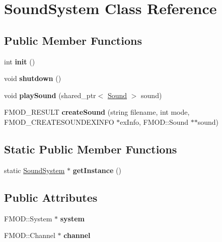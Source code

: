 \hypertarget{class_sound_system}{}\section{Sound\+System Class Reference}
\label{class_sound_system}
\subsection*{Public Member Functions}
\begin{DoxyCompactItemize}
\item 
\hypertarget{class_sound_system_adcb1d5df10d30863c668ac51102d680f}{}int {\bfseries init} ()\label{class_sound_system_adcb1d5df10d30863c668ac51102d680f}

\item 
\hypertarget{class_sound_system_a9c9f6c3017fba3fb02c226ea18940e7e}{}void {\bfseries shutdown} ()\label{class_sound_system_a9c9f6c3017fba3fb02c226ea18940e7e}

\item 
\hypertarget{class_sound_system_a67255f0007de8a4257bd214be5aecf9c}{}void {\bfseries play\+Sound} (shared\+\_\+ptr$<$ \hyperlink{class_sound}{Sound} $>$ sound)\label{class_sound_system_a67255f0007de8a4257bd214be5aecf9c}

\item 
\hypertarget{class_sound_system_a8ceb6af1ebfa69a61dfaed29f28a9b0c}{}F\+M\+O\+D\+\_\+\+R\+E\+S\+U\+L\+T {\bfseries create\+Sound} (string filename, int mode, F\+M\+O\+D\+\_\+\+C\+R\+E\+A\+T\+E\+S\+O\+U\+N\+D\+E\+X\+I\+N\+F\+O $\ast$ex\+Info, F\+M\+O\+D\+::\+Sound $\ast$$\ast$sound)\label{class_sound_system_a8ceb6af1ebfa69a61dfaed29f28a9b0c}

\end{DoxyCompactItemize}
\subsection*{Static Public Member Functions}
\begin{DoxyCompactItemize}
\item 
\hypertarget{class_sound_system_a7f6fe1a45ed73411b42ee0c18cc184d7}{}static \hyperlink{class_sound_system}{Sound\+System} $\ast$ {\bfseries get\+Instance} ()\label{class_sound_system_a7f6fe1a45ed73411b42ee0c18cc184d7}

\end{DoxyCompactItemize}
\subsection*{Public Attributes}
\begin{DoxyCompactItemize}
\item 
\hypertarget{class_sound_system_ada6f06657608c32304d30f4ef8825256}{}F\+M\+O\+D\+::\+System $\ast$ {\bfseries system}\label{class_sound_system_ada6f06657608c32304d30f4ef8825256}

\item 
\hypertarget{class_sound_system_a7ce2104c8728b305f84c120bc59058d6}{}F\+M\+O\+D\+::\+Channel $\ast$ {\bfseries channel}\label{class_sound_system_a7ce2104c8728b305f84c120bc59058d6}

\end{DoxyCompactItemize}



